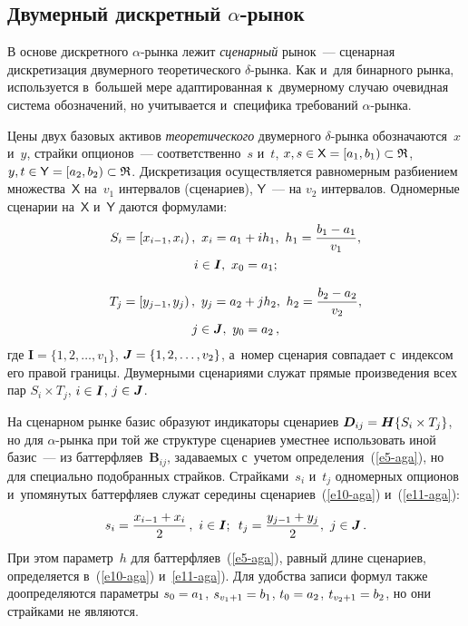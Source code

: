 \begin{multicols}{2}
  \section{Двумерный дискретный $\alpha$-рынок}
   
  В основе дискретного $\alpha$-рын\-ка лежит \textit{сценарный} рынок~--- 
сценарная дискретизация двумерного тео\-ре\-ти\-че\-ско\-го $\delta$-рын\-ка. Как 
и~для бинарного рынка, используется в~большей мере адаптированная 
к~двумерному случаю очевидная сис\-те\-ма обозначений, но учитывается 
и~специфика требований $\alpha$-рынка. 
  
  Цены двух базовых активов \textit{теоретического} двумерного  
$\delta$-рын\-ка обозначаются~$x$ и~$y$, страйки опционов~--- 
соответственно~$s$ и~$t$, $x, s \hm\in {\mathsf X} \hm=[a_1,b_1)\hm\subset 
\mathfrak{R}$, $y,t \hm\in {\mathsf Y}\hm=[a_2,b_2) \hm\subset \mathfrak{R}$. 
Дискретизация осуществляется равномерным разбиением множества~${\mathsf 
X}$ на~$v_1$ интервалов (сценариев), ${\mathsf Y}$~--- на $v_2$ интервалов. 
Одномерные сценарии на~${\mathsf X}$ и~${\mathsf Y}$ даются формулами: 
  \begin{multline}
  S_i= \left[ x_{i-1},x_i\right),\ x_i=a_1+ih_1,\ h_1=\fr{b_1-a_1}{v_1},\\
   i\in  \bm{I},\ x_0=a_1; \label{e10-aga}
   \end{multline}
   
   \vspace*{-12pt}
   
   \noindent
   \begin{multline}
  T_j= \left [ y_{j-1},y_j\right),\ y_j= a_2+jh_2,\ h_2=\fr{b_2-a_2}{v_2},\\ j\in 
\bm{J},\ y_0=a_2\,,
  \label{e11-aga}
\end{multline}
где $\bm{I}=\{1,2, \ldots, v_1\}$, $\bm{J}\hm=\{1,2,\ldots , v_2\}$, а~номер 
сценария совпадает с~индексом его правой границы. Двумерными сценариями 
служат прямые произведения всех пар $S_i\times T_j$, $i\hm\in \bm{I}$, $j\hm\in 
\bm{J}$. 
  
  На сценарном рынке базис образуют индикаторы сценариев 
$\bm{D}_{ij}\hm=\bm{H}\{S_i\times T_j\}$, но для $\alpha$-рын\-ка при той же структуре 
сценариев уместнее использовать иной базис~--- из баттерфляев~$\bm{B}_{ij}$, 
задаваемых с~учетом определения~(\ref{e5-aga}), но для специально 
подобранных страйков. Страйками~$s_i$ и~$t_j$ одномерных опционов 
и~упомянутых баттерфляев служат середины сценариев~(\ref{e10-aga}) 
и~(\ref{e11-aga}): 
  $$
  s_i = \displaystyle\frac{\displaystyle x_{i-1} + x_i\mathstrut}{\displaystyle 2\mathstrut}\,,\  i\in \bm{I}; \enskip   t_j = \displaystyle\frac{\displaystyle y_{j-1} + y_j\mathstrut}{\displaystyle 2\mathstrut},\   j\in 
\bm{J}\,. 
  $$
  При этом параметр~$h$ для баттерфляев~(\ref{e5-aga}), равный длине 
сценариев, определяется в~(\ref{e10-aga}) и~\ref{e11-aga}). Для удобства 
записи формул также доопределяются параметры $s_0 \hm= a_1$, $s_{v_1+1}\hm = 
b_1$, $t_0 \hm= a_2$, $t_{v_2+1}\hm = b_2$, но они страйками не являются. 
  

\end{multicols}
